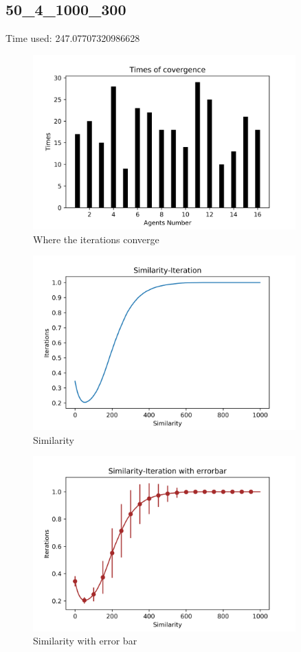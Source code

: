 \documentclass[a4paper,12pt]{article}
\begin{document}
    \subsection{50\_4\_1000\_300}
    Time used: 247.07707320986628		
    	\begin{figure}[H]
    	\centering
    	\includegraphics[width=0.9\textwidth]{agt50_4_1000_300}
    	\caption{Where the iterations converge}\label{agt50_4_1000_300}
    \end{figure}
    \begin{figure}[H]
    	\centering
    	\includegraphics[width=0.9\textwidth]{Sim50_4_1000_300}
    	\caption{Similarity}\label{Sim50_4_1000_300}
    \end{figure}
    \begin{figure}[H]
    	\centering
    	\includegraphics[width=0.9\textwidth]{SimErr50_4_1000_300}
    	\caption{Similarity with error bar}\label{SimErr50_4_1000_300}
    \end{figure}
\end{document}
